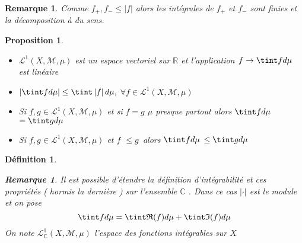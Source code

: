 \documentclass[3pt]{article}
\newtheorem{definition}[theorem]{D\'{e}finition}
\newtheorem{proposition}[theorem]{Proposition}
\newtheorem{remark}[theorem]{Remarque}
\begin{document}
\bigskip

\begin{remark}
Comme $f_{+},f_{-}\leq |f|$ alors les int\'{e}grales de $f_{+}$ et $f_{-}$
sont finies et la d\'{e}composition \`{a} du sens.
\end{remark}

\bigskip

\begin{proposition}
\begin{itemize}
\item $\mathcal{L}^{1}(X,\mathcal{M},\mu )$ est un espace vectoriel sur $%
\mathbb{R}$ et l'application $f\rightarrow \tint fd\mu $ est lin\'{e}aire

\item $\left\vert \tint fd\mu \right\vert \leq \tint \left\vert f\right\vert
d\mu ,$ $\forall f\in \mathcal{L}^{1}(X,\mathcal{M},\mu )$

\item Si $f,g\in \mathcal{L}^{1}(X,\mathcal{M},\mu )$ et si $f=g$ $\mu $
presque partout alors $\tint fd\mu $ $=\tint gd\mu $

\item Si $f,g\in \mathcal{L}^{1}(X,\mathcal{M},\mu )$ et $f$ $\leq g$\ alors 
$\tint fd\mu $ $\leq \tint gd\mu $
\end{itemize}
\end{proposition}

\bigskip

\begin{definition}
\begin{remark}
Il est possible d'\'{e}tendre la d\'{e}finition d'int\'{e}grabilit\'{e} et
ces propri\'{e}t\'{e}s ( hormis la derni\`{e}re ) sur l'ensemble $\mathbb{C}$%
. Dans ce cas $\left\vert \cdot \right\vert $ est le module et on pose 
\begin{equation*}
\tint fd\mu =\tint \mathfrak{R}(f)d\mu +\tint \mathfrak{I}(f)d\mu
\end{equation*}%
On note $\mathcal{L}_{\mathbb{C}}^{1}(X,\mathcal{M},\mu )$ l'espace des
fonctions int\'{e}grables sur $X$
\end{remark}
\end{definition}

\bigskip
\end{document}
